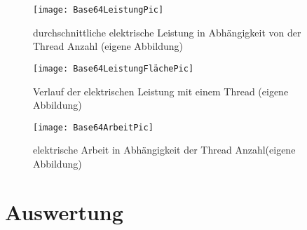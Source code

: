 

\begin{figure}[h]
	\begin{center}	 
	\texttt{[image: Base64LeistungPic]}
	\caption{durchschnittliche elektrische Leistung in Abhängigkeit von der Thread Anzahl (eigene Abbildung)}
	\label{fig:Base64LeistungPic} 
	\end{center}
\end{figure}



\begin{figure}[H]
	\begin{center}	 
	\texttt{[image: Base64LeistungFlächePic]}
	\caption{Verlauf der elektrischen Leistung mit einem Thread (eigene Abbildung)}
	\label{fig:Base64LeistungFlächePic} 
	\end{center}
\end{figure}

\begin{figure}[H]
	\begin{center}	 
	\texttt{[image: Base64ArbeitPic]}
	\caption{elektrische Arbeit in Abhängigkeit der Thread Anzahl(eigene Abbildung)}
	\label{fig:Base64ArbeitPic} 
	\end{center}
\end{figure}


\section{Auswertung}